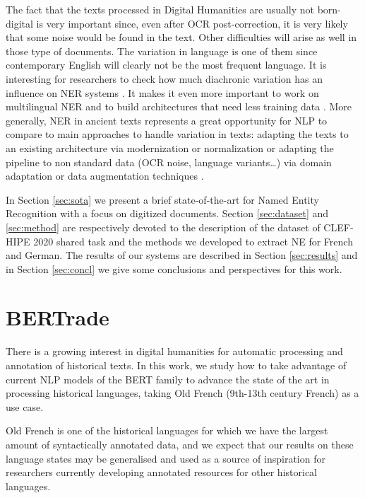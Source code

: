 The fact that the texts processed in Digital Humanities are usually not born-digital is very important since, even after OCR post-correction, it is very likely that some noise would be found in the text.
Other difficulties will arise as well in those type of documents. The variation in language is one of them since contemporary English will clearly not be the most frequent language.  It is interesting for researchers to check how much diachronic variation has an influence on NER systems \cite{ehrmann-etal-2016-diachronic}.
It makes it even more important to work on multilingual NER and to build architectures that need less training data \cite{rahimi-etal-2019-massively}.
More generally, NER in ancient texts represents a great opportunity for NLP to compare to main approaches to handle variation in texts: adapting the texts to an existing architecture via modernization or normalization \cite{leaman-etal-2016-taggerone} or adapting the pipeline to non standard data (OCR noise, language variants\dots) via domain adaptation or data augmentation techniques \cite{ghannay-etal-2018-end}.

In Section \ref{sec:sota} we present a brief state-of-the-art for Named Entity Recognition with a focus on digitized documents. Section \ref{sec:dataset} and \ref{sec:method} are respectively devoted to the description of the dataset of CLEF-HIPE 2020 shared task and the methods we developed to extract NE for French and German.
The results of our systems are described in Section \ref{sec:results} and in Section \ref{sec:concl} we give some conclusions and perspectives for this work.


\section{BERTrade}

There is a growing interest in digital humanities for automatic processing and annotation of historical texts. In this work, we study how to take advantage of current NLP models of the BERT family to advance the state of the art in processing historical languages, taking Old French (9th-13th century French) as a use case.

Old French is one of the historical languages for which we have the largest amount of syntactically annotated data, and we expect that our results on these language states may be generalised and used as a source of inspiration for researchers currently developing annotated resources for other historical languages.

